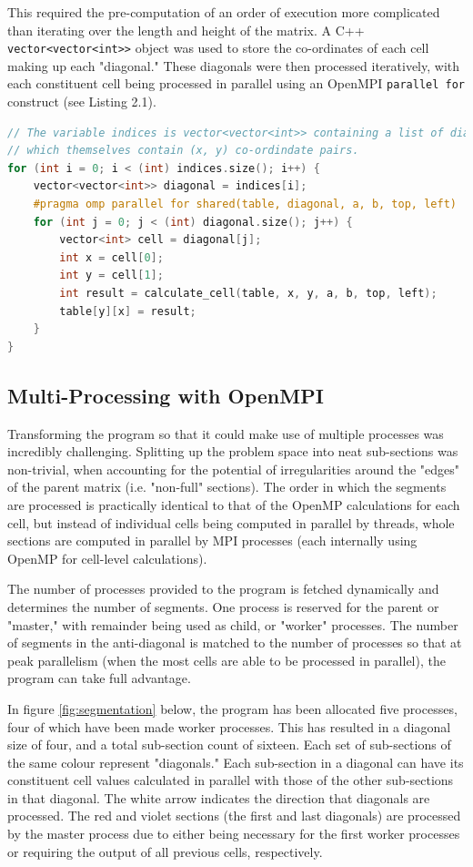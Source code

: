 This required the pre-computation of an order of execution more complicated than iterating over the length and height of the matrix. A C++ \lstinline{vector<vector<int>>} object was used to store the co-ordinates of each cell making up each "diagonal." These diagonals were then processed iteratively, with each constituent cell being processed in parallel using an OpenMPI \lstinline{parallel for} construct (see Listing 2.1).

\begin{lstlisting}[language=C++, caption=OpenMP Utilisation]
// The variable indices is vector<vector<int>> containing a list of diagonals
// which themselves contain (x, y) co-ordindate pairs.
for (int i = 0; i < (int) indices.size(); i++) {
    vector<vector<int>> diagonal = indices[i];
    #pragma omp parallel for shared(table, diagonal, a, b, top, left)
    for (int j = 0; j < (int) diagonal.size(); j++) {
        vector<int> cell = diagonal[j];
        int x = cell[0];
        int y = cell[1];
        int result = calculate_cell(table, x, y, a, b, top, left);
        table[y][x] = result;
    }
}
\end{lstlisting}

\subsection{Multi-Processing with OpenMPI}
Transforming the program so that it could make use of multiple processes was incredibly challenging. Splitting up the problem space into neat sub-sections was non-trivial, when accounting for the potential of irregularities around the "edges" of the parent matrix (i.e. "non-full" sections). The order in which the segments are processed is practically identical to that of the OpenMP calculations for each cell, but instead of individual cells being computed in parallel by threads, whole sections are computed in parallel by MPI processes (each internally using OpenMP for cell-level calculations). 

The number of processes provided to the program is fetched dynamically and determines the number of segments. One process is reserved for the parent or "master," with remainder being used as child, or "worker" processes. The number of segments in the anti-diagonal is matched to the number of processes so that at peak parallelism (when the most cells are able to be processed in parallel), the program can take full advantage.

In figure \ref{fig:segmentation} below, the program has been allocated five processes, four of which have been made worker processes. This has resulted in a diagonal size of four, and a total sub-section count of sixteen. Each set of sub-sections of the same colour represent "diagonals." Each sub-section in a diagonal can have its constituent cell values calculated in parallel with those of the other sub-sections in that diagonal. The white arrow indicates the direction that diagonals are processed. The red and violet sections (the first and last diagonals) are processed by the master process due to either being necessary for the first worker processes or requiring the output of all previous cells, respectively.

